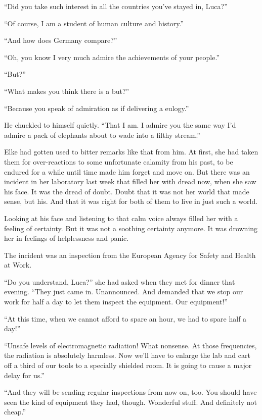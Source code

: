 ``Did you take such interest in all the countries you've stayed in, Luca?''

``Of course, I am a student of human culture and history.''

``And how does Germany compare?''

``Oh, you know I very much admire the achievements of your people.''

``But?''

``What makes you think there is a but?''

``Because you speak of admiration as if delivering a eulogy.''

He chuckled to himself quietly. ``That I am. I admire you the same way I'd admire a pack of elephants about to wade into a filthy stream.''

\sectionline

Elke had gotten used to bitter remarks like that from him. At first, she had taken them for over-reactions to some unfortunate calamity from his past, to be endured for a while until time made him forget and move on. But there was an incident in her laboratory last week that filled her with dread now, when she saw his face. It was the dread of doubt. Doubt that it was not her world that made sense, but his. And that it was right for both of them to live in just such a world.

Looking at his face and listening to that calm voice always filled her with a feeling of certainty. But it was not a soothing certainty anymore. It was drowning her in feelings of helplessness and panic.

The incident was an inspection from the European Agency for Safety and Health at Work.

``Do you understand, Luca?'' she had asked when they met for dinner that evening. ``They just came in. Unannounced. And demanded that we stop our work for half a day to let them inspect the equipment. Our equipment!''

``At this time, when we cannot afford to spare an hour, we had to spare half a day!''

``Unsafe levels of electromagnetic radiation! What nonsense. At those frequencies, the radiation is absolutely harmless. Now we'll have to enlarge the lab and cart off a third of our tools to a specially shielded room. It is going to cause a major delay for us.''

``And they will be sending regular inspections from now on, too. You should have seen the kind of equipment they had, though. Wonderful stuff. And definitely not cheap.''


